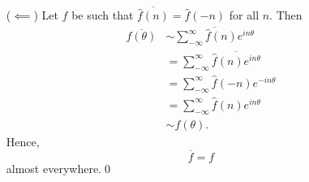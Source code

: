 \documentclass[oneside]{article}
\begin{document}
\begin{enumerate}[label=(\alph*)]
\begin{itemize}[leftmargin=34pt]
    \item[($\impliedby$)] Let $f$ be such that
    $\overline{\hat{f}(n)} = \hat{f}(-n)$ for all $n$. Then \begin{align*}
      \overline{f(\theta)}
      &\sim \overline{\sum_{-\infty}^\infty \hat f(n)e^{in\theta}} \\
      &= \sum_{-\infty}^\infty \overline{\hat f(n)e^{in\theta}} \\
      &= \sum_{-\infty}^\infty \hat f(-n)e^{-in\theta} \\
      &= \sum_{-\infty}^\infty \hat f(n)e^{in\theta} \\
      &\sim f(\theta) \text{.}
    \end{align*} Hence,\[
      \overline f = f
    \] almost everywhere.\qed
  \end{itemize}
\end{enumerate}
\end{document}
